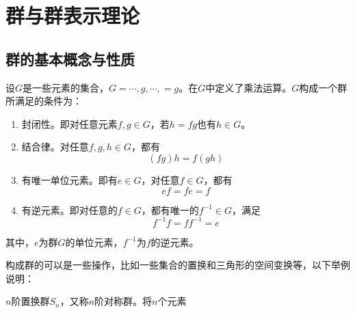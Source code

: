 \chapter{群与群表示理论}

\section{群的基本概念与性质}
\begin{definition}[群的定义]
	设$G$是一些元素的集合，$G = {\cdots, g, \cdots,} = {g}$。在$G$中定义了乘法运算。$G$构成一个群所满足的条件为：
	\begin{enumerate}
		\item 封闭性。即对任意元素$f, g \in G$，若$ h = fg$也有$h \in G$。
		\item 结合律。对任意$f, g, h \in G$，都有
			\begin{equation*}
				(fg)h = f(gh)
			\end{equation*} 
		\item 有唯一单位元素。即有$e \in G$，对任意$f \in G$，都有
			\begin{equation*}
			    ef = fe = f
			\end{equation*} 
		\item 有逆元素。即对任意的$f \in G$，都有唯一的$ f^{-1} \in G$，满足
			\begin{equation*}
				f^{-1} f = f f^{-1} = e
			\end{equation*} 
	\end{enumerate}
	其中，$e$为群$G$的单位元素，$f^{-1}$为$f$的逆元素。
\end{definition}
构成群的可以是一些操作，比如一些集合的置换和三角形的空间变换等，以下举例说明：
\begin{example}
	$n$阶置换群$S_n$，又称$n$阶对称群。将$n$个元素
\end{example}
